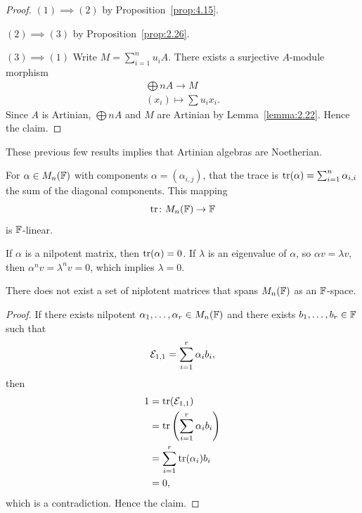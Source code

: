 \begin{proof}
$(1)\implies(2)$ by Proposition~\ref{prop:4.15}.

$(2)\implies(3)$ by Proposition~\ref{prop:2.26}.

$(3)\implies(1)$ Write $M=\sum^{n}_{i=1}u_{i}A$. There exists a
surjective $A$-module morphism
\begin{equation}
\begin{split}
\bigoplus nA\to M\\
(x_{i})\mapsto\sum u_{i}x_{i}.
\end{split}
\end{equation}
Since $A$ is Artinian, $\bigoplus nA$ and $M$ are Artinian by
Lemma~\ref{lemma:2.22}. Hence the claim.
\end{proof}

\begin{note}
These previous few results implies that Artinian algebras are Noetherian.
\end{note}

\begin{recall}
For $\alpha\in M_{n}(\mathbb{F})$ with components $\alpha=(\alpha_{i,j})$,
that the trace is $\operatorname{tr}(\alpha)=\sum^{n}_{i=1}\alpha_{i,i}$ the sum of
the diagonal components. This mapping
\begin{equation}
\operatorname{tr}\colon M_{n}(\mathbb{F})\to\mathbb{F}
\end{equation}
is $\mathbb{F}$-linear.

If $\alpha$ is a nilpotent matrix, then $\operatorname{tr}(\alpha)=0$.
If $\lambda$ is an eigenvalue of $\alpha$, so $\alpha v=\lambda v$,
then $\alpha^{n}v=\lambda^{n}v=0$, which implies $\lambda=0$.
\end{recall}

\begin{lemma}\label{lemma:4.17}
There does not exist a set of niplotent matrices that spans
$M_{n}(\mathbb{F})$ as an $\mathbb{F}$-space.
\end{lemma}

\begin{proof}
If there exists nilpotent $\alpha_{1},\dots,\alpha_{r}\in M_{n}(\mathbb{F})$
and there exists $b_{1},\dots,b_{r}\in\mathbb{F}$ such that
\begin{equation}
\mathcal{E}_{1,1}=\sum^{r}_{i=1}\alpha_{i}b_{i},
\end{equation}
then
\begin{subequations}
  \begin{align}
1 &=\operatorname{tr}(\mathcal{E}_{1,1})\\
&=\operatorname{tr}\left(\sum^{r}_{i=1}\alpha_{i}b_{i}\right)\\
&=\sum^{r}_{i=1}\operatorname{tr}(\alpha_{i})b_{i}\\
&=0,
  \end{align}
\end{subequations}
which is a contradiction. Hence the claim.
\end{proof}

